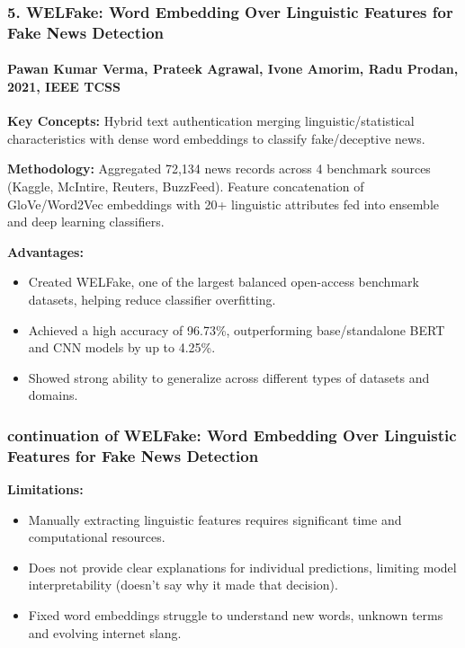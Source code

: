 \documentclass{beamer}
\begin{document}
\begin{frame}
\frametitle{5. WELFake: Word Embedding Over Linguistic Features for Fake News Detection}
\framesubtitle{Pawan Kumar Verma, Prateek Agrawal, Ivone Amorim, Radu Prodan, 2021, IEEE TCSS}
\small{
\textbf{Key Concepts:} Hybrid text authentication merging linguistic/statistical characteristics with dense word embeddings to classify fake/deceptive news. \par\vspace{0.15cm}
\textbf{Methodology:} Aggregated 72,134 news records across 4 benchmark sources (Kaggle, McIntire, Reuters, BuzzFeed). Feature concatenation of GloVe/Word2Vec embeddings with 20+ linguistic attributes fed into ensemble and deep learning classifiers. \par\vspace{0.15cm}
\textbf{Advantages:}
\begin{itemize}
    \item Created WELFake, one of the largest balanced open-access benchmark datasets, helping reduce classifier overfitting.
    \item Achieved a high accuracy of 96.73\%, outperforming base/standalone BERT and CNN models by up to 4.25\%.
    \item Showed strong ability to generalize across different types of datasets and domains.
\end{itemize}
}
\end{frame}

\begin{frame}
\frametitle{continuation of WELFake: Word Embedding Over Linguistic Features for Fake News Detection}
\large{
\textbf{Limitations:}
\begin{itemize}
    \item Manually extracting linguistic features requires significant time and computational resources.
    \item Does not provide clear explanations for individual predictions, limiting model interpretability (doesn't say why it made that decision).
    \item Fixed word embeddings struggle to understand new words, unknown terms and evolving internet slang.
\end{itemize}
}
\end{frame}
\end{document}
